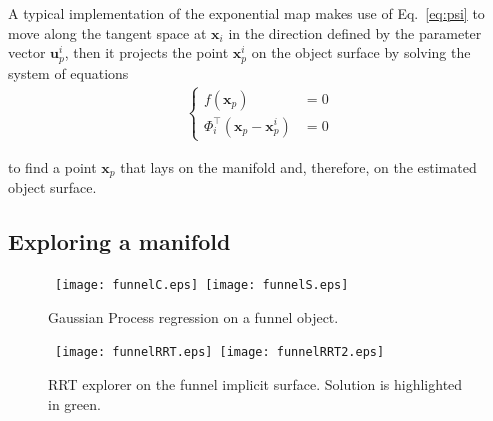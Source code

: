 A typical implementation of the exponential map makes use of Eq.~\ref{eq:psi} to move along the tangent space at $\mathbf{x}_i$ in the direction defined by the parameter vector $\mathbf{u}_p^i$, then it projects the point $\mathbf{x}_p^i$ on the object surface by solving the system of equations
\begin{align}
\label{eq:projection}
\begin{cases}
f(\mathbf{x}_p)&=0\\
\Phi_i^\top(\mathbf{x}_p-\mathbf{x}_p^i)&=0
\end{cases}
\end{align}

to find a point $\mathbf{x}_p$ that lays on the manifold and, therefore, on the estimated object surface. 

\subsection{Exploring a manifold}



\begin{figure}[h]
    \centering
    \mbox
    {
        \texttt{[image: funnelC.eps]}
        \texttt{[image: funnelS.eps]}
    }
    \caption{Gaussian Process regression on a funnel object. }
    \label{fig:GPfunnel}
\end{figure}
\begin{figure}[h]
    \centering
    \mbox
    {
    \texttt{[image: funnelRRT.eps]}
    \texttt{[image: funnelRRT2.eps]}
    }
    \caption{RRT explorer on the funnel implicit surface. Solution is highlighted in green.}
    \label{fig:RRTfunnel}
\end{figure}


























